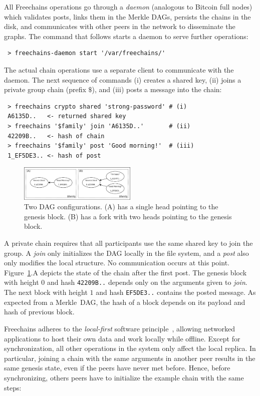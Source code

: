 \documentclass[10pt,journal,compsoc]{IEEEtran}
\newcommand{\FC}       {Freechains\xspace}
\begin{document}
All \FC operations go through a \emph{daemon} (analogous to Bitcoin full nodes)
which validates posts, links them in the Merkle DAGs, persists the chains in
the disk, and communicates with other peers in the network to disseminate the
graphs.
The command that follows starts a daemon to serve further operations:

{\footnotesize
\begin{verbatim}
 > freechains-daemon start '/var/freechains/'
\end{verbatim}
}

The actual chain operations use a separate client to communicate with the
daemon.
The next sequence of commands (i) creates a shared key, (ii) joins a private
group chain (prefix $\$$), and (iii) posts a message into the chain:

{\footnotesize
\begin{verbatim}
 > freechains crypto shared 'strong-password' # (i)
 A6135D..   <- returned shared key
 > freechains '$family' join 'A6135D..'       # (ii)
 42209B..   <- hash of chain
 > freechains '$family' post 'Good morning!'  # (iii)
 1_EF5DE3.. <- hash of post
\end{verbatim}
}

\begin{figure}[t]
\centering
\includegraphics[width=0.5\textwidth]{family.png}
\caption{Two DAG configurations. (A) has a single head pointing to the
genesis block. (B) has a fork with two heads pointing to the genesis block.}
\label{fig.family}
\end{figure}

A private chain requires that all participants use the same shared key to join
the group.
A \emph{join} only initializes the DAG locally in the file system, and a
\emph{post} also only modifies the local structure.
No communication occurs at this point.
Figure~\ref{fig.family}.A depicts the state of the chain after the first post.
The genesis block with height $0$ and hash \texttt{42209B..}
depends only on the arguments given to \emph{join}.
The next block with height $1$ and hash \texttt{EF5DE3..} contains the posted
message.
As expected from a Merkle~DAG, the hash of a block depends on its payload and
hash of previous block.

\FC adheres to the \emph{local-first} software principle~\cite{p2p.local},
allowing networked applications to host their own data and work locally while
offline.
Except for synchronization, all other operations in the system only affect the
local replica.
In particular, joining a chain with the same arguments in another peer results
in the same genesis state, even if the peers have never met before.
Hence, before synchronizing, others peers have to initialize the example chain
with the same steps:
\end{document}
